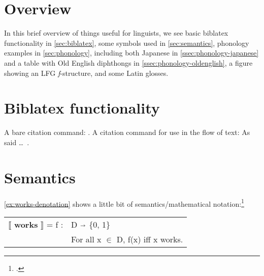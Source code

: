 \documentclass[a4paper,12pt,twoside]{article}
\begin{document}

\tableofcontents
\thispagestyle{toc}
\newpage

\listoffigures
\thispagestyle{lof}
\newpage

\listoftables
\thispagestyle{lot}
\newpage

\title{\thistitle}
\author{\thisauthor}

\maketitle
\thispagestyle{plain}

\section{Overview}

In this brief overview of things useful for linguists, we see basic biblatex
functionality in \autoref{sec:biblatex}, some symbols used in
\autoref{sec:semantics}, phonology examples in \autoref{sec:phonology},
including both Japanese in \autoref{ssec:phonology-japanese} and a table with
Old English diphthongs in \autoref{ssec:phonology-oldenglish}, a figure showing
an LFG \textit{f}-structure, and some Latin glosses.

\section{Biblatex functionality}
\label{sec:biblatex}

A bare citation command: \autocite{burgess-plunkett-2013-1}. A citation command
for use in the flow of text: As \textcite{burgess-plunkett-2013-1} said \dots~.

\section{Semantics}
\label{sec:semantics}

\autoref{ex:works-denotation} shows a little bit of semantics/mathematical
notation:\footcite[15]{heim-kratzer-1998}

\begin{exe}
    \ex\label{ex:works-denotation}

    \leavevmode\vadjust{\vspace{-\baselineskip}}

    \begin{tabular}[c]{l l}
      $\llbracket$ \textbf{works} $\rrbracket$ = f : & D $\shortrightarrow$ \{0, 1\} \\
                                                     & For all x $\in$ D, f(x) iff x works.  \\
    \end{tabular}

\end{exe}
\end{document}
